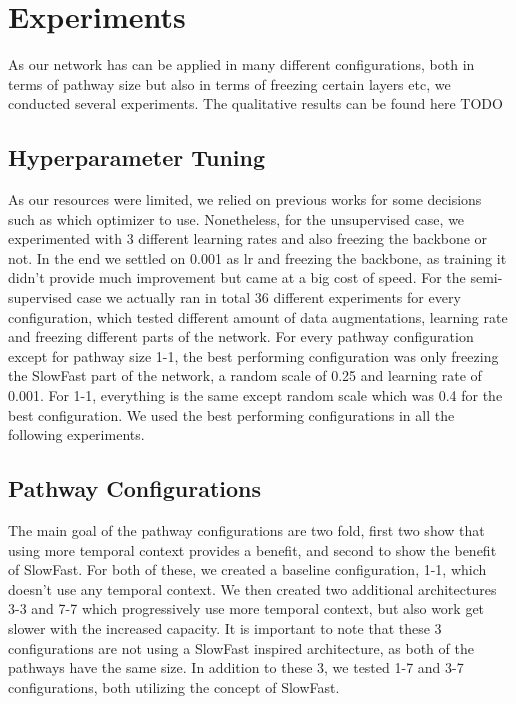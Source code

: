 \section{Experiments}
As our network has can be applied in many different configurations, both in terms of pathway size but also in terms of freezing certain layers etc, we conducted several experiments. The qualitative results can be found here TODO

\subsection{Hyperparameter Tuning}
As our resources were limited, we relied on previous works for some decisions such as which optimizer to use. Nonetheless, for the unsupervised case, we experimented with 3 different learning rates and also freezing the backbone or not. In the end we settled on 0.001 as lr and freezing the backbone, as training it didn't provide much improvement but came at a big cost of speed. For the semi-supervised case we actually ran in total 36 different experiments for every configuration, which tested different amount of data augmentations, learning rate and freezing different parts of the network. For every pathway configuration except for pathway size 1-1, the best performing configuration was only freezing the SlowFast part of the network, a random scale of 0.25 and learning rate of 0.001. For 1-1, everything is the same except random scale which was 0.4 for the best configuration. We used the best performing configurations in all the following experiments.

\subsection{Pathway Configurations}
The main goal of the pathway configurations are two fold, first two show that using more temporal context provides a benefit, and second to show the benefit of SlowFast. 
For both of these, we created a baseline configuration, 1-1, which doesn't use any temporal context. We then created two additional architectures 3-3 and 7-7 which progressively use more temporal context, but also work get slower with the increased capacity. It is important to note that these 3 configurations are not using a SlowFast inspired architecture, as both of the pathways have the same size. In addition to these 3, we tested 1-7 and 3-7 configurations, both utilizing the concept of SlowFast.

